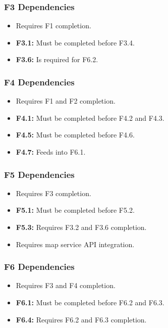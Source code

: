 \subsubsection{F3 Dependencies}
\begin{itemize}
    \item Requires F1 completion.
    \item \textbf{F3.1:} Must be completed before F3.4.
    \item \textbf{F3.6:} Is required for F6.2.
\end{itemize}

\subsubsection{F4 Dependencies}
\begin{itemize}
    \item Requires F1 and F2 completion.
    \item \textbf{F4.1:} Must be completed before F4.2 and F4.3.
    \item \textbf{F4.5:} Must be completed before F4.6.
    \item \textbf{F4.7:} Feeds into F6.1.
\end{itemize}

\subsubsection{F5 Dependencies}
\begin{itemize}
    \item Requires F3 completion.
    \item \textbf{F5.1:} Must be completed before F5.2.
    \item \textbf{F5.3:} Requires F3.2 and F3.6 completion.
    \item Requires map service API integration.
\end{itemize}

\subsubsection{F6 Dependencies}
\begin{itemize}
    \item Requires F3 and F4 completion.
    \item \textbf{F6.1:} Must be completed before F6.2 and F6.3.
    \item \textbf{F6.4:} Requires F6.2 and F6.3 completion.
\end{itemize}

